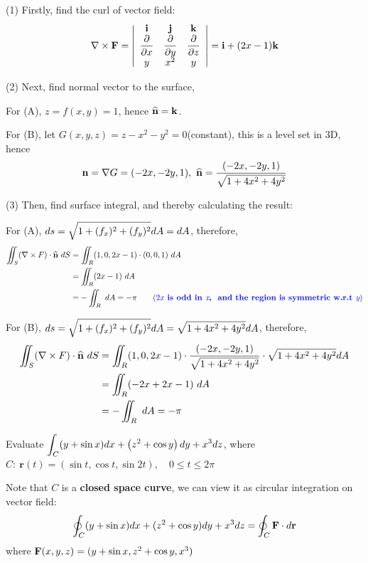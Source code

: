 \begin{spacing}{1.3}
    (1) Firstly, find the curl of vector field:
    $$\nabla\times {\bf F}=\left|\begin{array}{ccc}
        {\bf i} & {\bf j} & {\bf k} \\
        \dfrac{\partial }{\partial x} & \dfrac{\partial}{\partial y} & \dfrac{\partial}{\partial z}\\
        y & x^2 & y
    \end{array} \right|={\bf i}+(2x-1){\bf k}$$

    (2) Next, find normal vector to the surface,

    \quad For (A), $z=f(x,y)=1$, hence $\widehat{\bf n} = {\bf k}$.

    \quad For (B), let $G(x,y,z)=z-x^2-y^2=0$(constant), this is a level set in 3D, hence 
    $${\bf n} =\nabla G=(-2x, -2y, 1),\ \widehat{\bf n} =\frac{(-2x,-2y,1)}{\sqrt{1+4x^2+4y^2}}$$

    (3) Then, find surface integral, and thereby calculating the result:

    \quad For (A), $\displaystyle ds=\sqrt{1+(f_x)^2+(f_y)^2} dA=dA$, therefore,
    \begin{align*}
        \iint_S(\nabla \times F)\cdot \nm \ dS &= \iint_R (1,0,2x-1)\cdot (0,0,1)\ dA\\
        &=\iint_R (2x-1)\  dA\\
        &= -\iint_R \ dA = -\pi \qquad {\blue (2x\ \textbf{is\ odd\ in\ {\it x},
        \ and\ the\ region\ is\ symmetric\ w.r.t\ {\it y}})}
    \end{align*}

    \quad For (B), $\displaystyle ds=\sqrt{1+(f_x)^2+(f_y)^2} dA=\sqrt{1+4x^2+4y^2}dA$, therefore,
    \begin{align*}
        \iint_S(\nabla \times F)\cdot \widehat{\bf n} \ dS 
        &= \iint_R (1,0,2x-1)\cdot \frac{(-2x,-2y,1)}{\sqrt{1+4x^2+4y^2}}\cdot \sqrt{1+4x^2+4y^2}dA\\
        &=\iint_R (-2x+2x-1)\  dA\\
        &= -\iint_R \ dA = -\pi
    \end{align*}


    \newpage
    \eg Evaluate $\displaystyle \int_{C}(y+\sin x) d x+\left(z^{2}+\cos y\right) d y+x^{3} d z$, 
    where $C:\ \mathbf{r}(t)=(\sin t, \cos t, \sin 2 t), \quad 0 \leqslant t \leqslant 2 \pi$
    
    \sol Note that $C$ is a {\bf closed space curve}, we can view it as circular integration on vector field:
    $$\oint_C (y+\sin x)dx+(z^2+\cos y)dy+x^3 dz=\oint_C {\bf F}\cdot d{\bf r}$$
    where ${\bf F}(x,y,z)=(y+\sin x, z^2+\cos y, x^3)$


\end{spacing}
